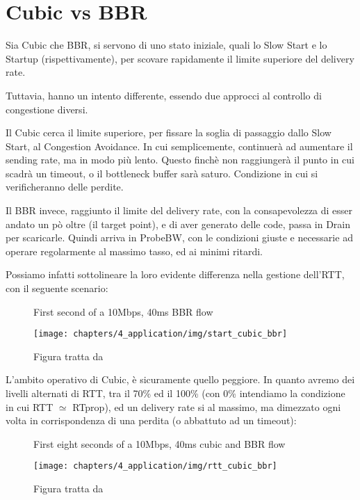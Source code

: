 \section{Cubic vs BBR}

Sia Cubic che BBR, si servono di uno stato iniziale, quali lo Slow Start e lo Startup (rispettivamente), per scovare rapidamente il limite superiore del delivery rate. \bigskip

Tuttavia, hanno un intento differente, essendo due approcci al controllo di congestione diversi. \bigskip

Il Cubic cerca il limite superiore, per fissare la soglia di passaggio dallo Slow Start, al Congestion Avoidance. In cui semplicemente, continuerà ad aumentare il sending rate, ma in modo più lento. Questo finchè non raggiungerà il punto in cui scadrà un timeout, o il bottleneck buffer sarà saturo. Condizione in cui si verificheranno delle perdite. \bigskip

Il BBR invece, raggiunto il limite del delivery rate, con la consapevolezza di esser andato un pò oltre (il target point), e di aver generato delle code, passa in Drain per scaricarle.
Quindi arriva in ProbeBW, con le condizioni giuste e necessarie ad operare regolarmente al massimo tasso, ed ai minimi ritardi. \bigskip

Possiamo infatti sottolineare la loro evidente differenza nella gestione dell'RTT, con il seguente scenario:

\begin{figure}[H]

\center
\caption{First second of a 10Mbps, 40ms BBR flow}
\texttt{[image: chapters/4\_application/img/start\_cubic\_bbr]}
\caption*{Figura tratta da \cite[p.~63]{Cardwell:2017:BCC:3042068.3009824}}

\end{figure}

L'ambito operativo di Cubic, è sicuramente quello peggiore. In quanto avremo dei livelli alternati di RTT, tra il 70\% ed il 100\% (con 0\% intendiamo la condizione in cui RTT $ \simeq $ RTprop), ed un delivery rate si al massimo, ma dimezzato ogni volta in corrispondenza di una perdita (o abbattuto ad un timeout):

\begin{figure}[H]

\center
\caption{First eight seconds of a 10Mbps, 40ms cubic and BBR flow}
\texttt{[image: chapters/4\_application/img/rtt\_cubic\_bbr]}
\caption*{Figura tratta da \cite[p.~64]{Cardwell:2017:BCC:3042068.3009824}}

\end{figure}

